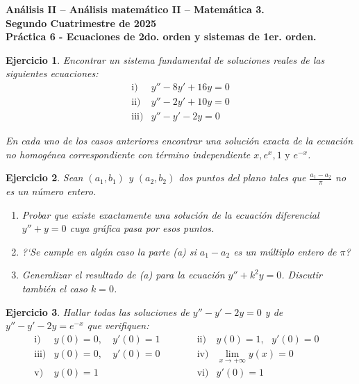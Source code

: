 \documentclass[11pt]{article}
\newtheorem{ej}{Ejercicio}%
\newcommand{\bej}[1]{\begin{ej}\rm{#1}}
\newcommand{\eej}{\end{ej}\vspace{-0.2cm}}
\begin{document}
%
%
%
%

\begin{center}

\bf{\Large An\'alisis II -- An\'alisis matem\'atico II -- Matem\'atica 3.} \\
\bigskip
\bf{\large Segundo Cuatrimestre de 2025}\\
\bigskip
\bf{Pr\'actica 6 - Ecuaciones de 2do. orden y sistemas de 1er. orden.}
\end{center}

\bigskip

\setcounter{equation}{0}



\bej  Encontrar un sistema fundamental de soluciones reales de las siguientes
ecuaciones:
\[
\begin{array}{ll}
\mbox{i)}&y''-8y'+16y=0\\
\mbox{ii)}&y''-2y'+10y=0\\
\mbox{iii)}&y''-y'-2y=0
\end{array}
\]

 En cada uno de los casos anteriores encontrar una soluci\'on exacta
de la ecuaci\'on no homog\'enea correspondiente con t\'ermino
independiente $x, e^x,1 \mbox{ y } e^{-x}$.

\eej

\bej Sean $(a_{1},b_{1})$ y $(a_{2},b_{2})$ dos puntos del plano tales que
$\frac{a_{1}-a_{2}}{\pi}$ no es un n\'umero entero.
\begin{enumerate}
\item Probar que existe exactamente una soluci\'on de la ecuaci\'on
diferencial $y''+y=0$ cuya gr\'afica pasa por esos puntos.

\item ?`Se cumple en alg\'un caso la parte (a) si $a_{1}-a_{2}$ es un m\'ultiplo
entero de $\pi$?

\item Generalizar el resultado de (a) para la ecuaci\'on $y''+k^{2}y=0$. Discutir
tambi\'en el caso $k=0$.
\end{enumerate}
\eej

\bej Hallar todas las soluciones de $y''-y'-2y=0$ y de $y''-y'-2y= e^{-x}$
que verifiquen:
\[
\begin{array}{llllll}
\mbox{i)} &y(0)=0,\ &y'(0)=1\qquad\quad&\mbox{ii)}&y(0)=1,\ \ \ y'(0)=0\\
\mbox{iii)}&y(0)=0,&y'(0)=0&\mbox{iv)}&\lim_{x \rightarrow +\infty} y(x)=0&\\
\mbox{v)}&y(0)=1&&\mbox{vi)}&y'(0)=1&
\end{array}
\]
\eej
\end{document}
